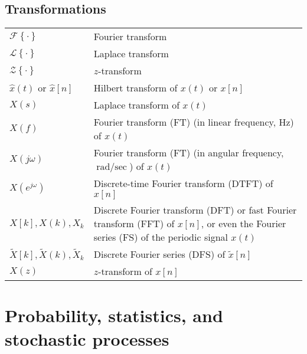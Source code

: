 \documentclass{article}
\begin{document}
\subsection{Transformations}
\begin{xltabular}{\textwidth}{XX}
    \(\mathcal{F}\left\{ \cdot \right\}\) & Fourier transform\\
    \(\mathcal{L}\left\{ \cdot \right\}\) & Laplace transform\\
    \(\mathcal{Z}\left\{ \cdot \right\}\) & \(z\)-transform\\
    \(\hat{x}(t)\) or \(\hat{x}[n]\) & Hilbert transform of \(x(t)\) or \(x[n]\)\\
    \(X(s)\) & Laplace transform of \(x(t)\)\\
    \(X(f)\) & Fourier transform (FT) (in linear frequency, \(\unit{\Hz}\)) of \(x(t)\)\\
    \(X(j\omega)\) & Fourier transform (FT) (in angular frequency, \(\unit{\radian\per\sec}\)) of \(x(t)\)\\
    \(X(e^{j\omega})\) & Discrete-time Fourier transform (DTFT) of \(x[n]\)\\
    \(X[k], X(k), X_k\) & Discrete Fourier transform (DFT) or fast Fourier transform (FFT) of \(x[n]\), or even the Fourier series (FS) of the periodic signal \(x(t)\)\\
    \(\tilde{X}[k], \tilde{X}(k), \tilde{X}_k\) & Discrete Fourier series (DFS) of \(\tilde{x}[n]\)\\
    \(X(z)\) & \(z\)-transform of \(x[n]\)\\
\end{xltabular}

\section{Probability, statistics, and stochastic processes}
\end{document}
